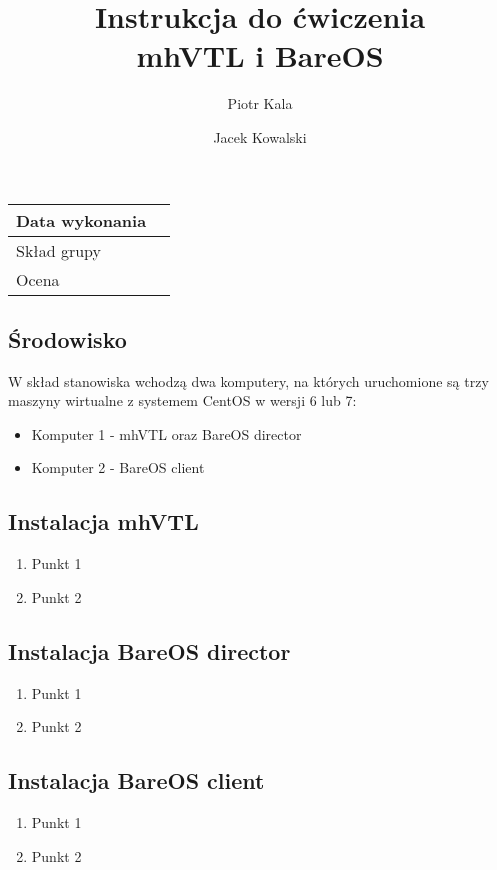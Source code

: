 \documentclass[polish]{article}
\title{\textbf{Instrukcja do ćwiczenia}\\ mhVTL i BareOS}
\author{Piotr Kala \and Jacek Kowalski}
\begin{document}
\maketitle

\begin{tabular}{|l|p{}|}
\hline
Data wykonania & \\
\hline
Skład grupy & \\
\hline
Ocena & \\
\hline
\end{tabular}

\vspace{0.5cm}

\renewcommand{\labelenumi}{$\Box$\texttt{\theenumi}}
\renewcommand{\labelenumii}{$\Box$\texttt{\theenumii}}

\subsection*{Środowisko}

W skład stanowiska wchodzą dwa komputery, na których uruchomione są
trzy maszyny wirtualne z systemem CentOS w wersji 6 lub 7:

\begin{itemize}
\item Komputer 1 - mhVTL oraz BareOS director
\item Komputer 2 - BareOS client
\end{itemize}

\subsection*{Instalacja mhVTL}

\begin{enumerate}
\item Punkt 1
\item Punkt 2
\end{enumerate}

\subsection*{Instalacja BareOS director}

\begin{enumerate}
\item Punkt 1
\item Punkt 2
\end{enumerate}

\subsection*{Instalacja BareOS client}

\begin{enumerate}
\item Punkt 1
\item Punkt 2
\end{enumerate}
\end{document}
